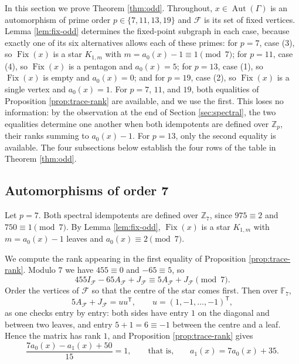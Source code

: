 \documentclass[11pt]{article}
\theoremstyle{plain}
\theoremstyle{remark}
\newcommand{\Aut}{\operatorname{Aut}}
\newcommand{\Fix}{\operatorname{Fix}}
\newcommand{\Zp}{\mathbb Z_p}
\begin{document}
In this section we prove Theorem \ref{thm:odd}.
Throughout,
$x\in\Aut(\Gamma)$ is an automorphism of prime order $p\in\{7,11,13,19\}$ and $\mathcal F$ is its set of fixed vertices.
Lemma \ref{lem:fix-odd} determines the fixed-point subgraph in each case,
because exactly one of its six alternatives allows each of these primes: for $p=7$, case (3),
so $\Fix(x)$ is a star $K_{1,m}$ with $m=a_0(x)-1\equiv 1\pmod 7$; for $p=11$, case (4),
so $\Fix(x)$ is a pentagon and $a_0(x)=5$; for $p=13$, case (1), so $\Fix(x)$ is empty and $a_0(x)=0$; and for $p=19$,
case (2), so $\Fix(x)$ is a single vertex and $a_0(x)=1$.
For $p=7$, $11$, and $19$, both equalities of Proposition \ref{prop:trace-rank} are available, and we use the first.
This loses no information: by the observation at the end of Section \ref{sec:spectral},
the two equalities determine one another when both idempotents are defined over $\Zp$, their ranks summing to $a_0(x)-1$.
For $p=13$, only the second equality is available.
The four subsections below establish the four rows of the table in Theorem \ref{thm:odd}.

\subsection{Automorphisms of order 7}\label{subsec:order7}

Let $p=7$.
Both spectral idempotents are defined over $\mathbb Z_7$, since $975\equiv 2$ and $750\equiv 1\pmod 7$.
By Lemma \ref{lem:fix-odd}, $\Fix(x)$ is a star $K_{1,m}$ with $m=a_0(x)-1$ leaves and $a_0(x)\equiv 2\pmod 7$.

We compute the rank appearing in the first equality of Proposition \ref{prop:trace-rank}.
Modulo $7$ we have $455\equiv 0$ and $-65\equiv 5$, so
\[
 455I_{\mathcal F}-65A_{\mathcal F}+J_{\mathcal F}\equiv 5A_{\mathcal F}+J_{\mathcal F}\pmod 7.
\]
Order the vertices of $\mathcal F$ so that the centre of the star comes first.
Then over $\mathbb F_7$,
\[
 5A_{\mathcal F}+J_{\mathcal F}=uu^{\mathsf T},
 \qquad
 u=(1,-1,\dots,-1)^{\mathsf T},
\]
as one checks entry by entry: both sides have entry $1$ on the diagonal and between two leaves,
and entry $5+1=6\equiv -1$ between the centre and a leaf.
Hence the matrix has rank $1$, and Proposition \ref{prop:trace-rank} gives
\[
 \frac{7a_0(x)-a_1(x)+50}{15}=1,
 \qquad\text{that is,}\qquad
 a_1(x)=7a_0(x)+35.
\]
\end{document}
